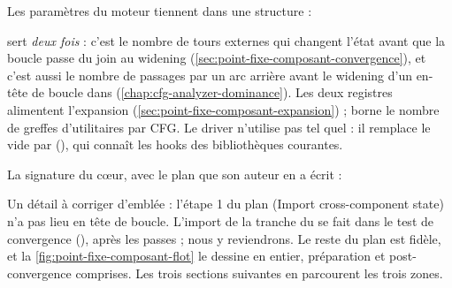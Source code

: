 Les paramètres du moteur tiennent dans une structure :


 sert \emph{deux fois} : c'est le nombre de tours
externes qui changent l'état avant que la boucle passe du join au widening
(\cref{sec:point-fixe-composant-convergence}), et c'est aussi le nombre de
passages par un arc arrière avant le widening d'un en-tête de boucle dans
 (\cref{chap:cfg-analyzer-dominance}). Les deux registres
alimentent l'expansion (\cref{sec:point-fixe-composant-expansion}) ;
 borne le nombre de greffes d'utilitaires par CFG. Le
driver n'utilise pas  tel quel : il remplace le
 vide par 
(), qui connaît les hooks des bibliothèques
courantes.

La signature du cœur, avec le plan que son auteur en a écrit :


Un détail à corriger d'emblée : l'étape 1 du plan (\og Import cross-component
state\fg) n'a pas lieu en tête de boucle. L'import de la tranche du
 se fait dans le test de convergence
(), après les passes ; nous y
reviendrons. Le reste du plan est fidèle, et la
\cref{fig:point-fixe-composant-flot} le dessine en entier, préparation et
post-convergence comprises. Les trois sections suivantes en parcourent les
trois zones.

